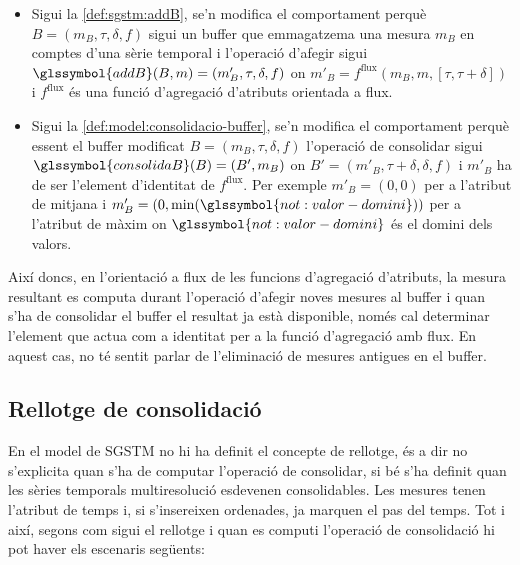 \begin{itemize}
\item Sigui la \autoref{def:sgstm:addB}, se'n modifica el comportament
  perquè $B=(m_B,\tau,\delta,f)$ sigui un buffer que emmagatzema una
  mesura $m_B$ en comptes d'una sèrie temporal i l'operació d'afegir
  sigui $\glssymbol{addB}(B,m)= (m'_B,\tau,\delta,f)$ on $m'_B =
  f^\text{flux}(m_B,m,[\tau,\tau+\delta])$ i $f^\text{flux}$ és una
  funció d'agregació d'atributs orientada a flux.


\item Sigui la \autoref{def:model:consolidacio-buffer}, se'n modifica
  el comportament perquè essent el buffer modificat
  $B=(m_B,\tau,\delta,f)$ l'operació de consolidar sigui
  $\glssymbol{consolidaB}(B) = (B',m_B)$ on
  $B'=(m'_B,\tau+\delta,\delta,f)$ i $m'_B$ ha de ser l'element
  d'identitat de $f^\text{flux}$. Per exemple $m'_B=(0,0)$ per a l'atribut
  de mitjana i $m'_B=(0,\min(\glssymbol{not:valor-domini}))$ per a
  l'atribut de màxim on $\glssymbol{not:valor-domini}$ és el domini
  dels valors. 

\end{itemize}

Així doncs, en l'orientació a flux de les funcions d'agregació
d'atributs, la mesura resultant es computa durant l'operació d'afegir
noves mesures al buffer i quan s'ha de consolidar el buffer el
resultat ja està disponible, només cal determinar l'element que actua
com a identitat per a la funció d'agregació amb flux.  En aquest cas,
no té sentit parlar de l'eliminació de mesures antigues en el buffer.










\subsection{Rellotge de consolidació}


En el model de \gls{SGSTM} no hi ha definit el concepte de rellotge,
és a dir no s'explicita quan s'ha de computar l'operació de
consolidar, si bé s'ha definit quan les sèries temporals
multiresolució esdevenen consolidables.  Les mesures tenen l'atribut
de temps i, si s'insereixen ordenades, ja marquen el pas del temps.
Tot i així, segons com sigui el rellotge i quan es computi l'operació
de consolidació hi pot haver els escenaris següents:

